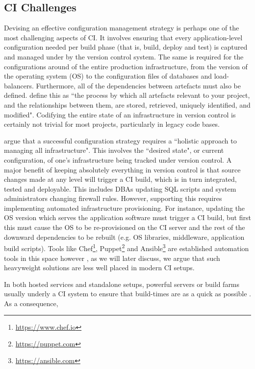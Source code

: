\documentclass[journal]{IEEEtran}
\begin{document}
\subsection{CI Challenges}
Devising an effective configuration management strategy is perhaps one of the
most challenging aspects of CI. It involves ensuring that every application-level configuration
needed per build phase (that is, build, deploy and test) is captured and managed under by the
version control system. The same is required for the configurations around of the entire
production infrastructure, from the version of the operating system (OS)
to the configuration files of databases and load-balancers. Furthermore, all of 
the dependencies between artefacts must also be defined. \citep{Jez}
define this as ``the process by which all artefacts relevant to
your project, and the relationships between them, are stored, retrieved, uniquely
identified, and modified". Codifying the entire state of an infrastructure in
version control is certainly not trivial for most projects, particularly in legacy code bases.
\par
\citet{Jez} argue that a successful configuration strategy requires a ``holistic approach to 
managing all infrastructure". This involves the ``desired state", or current configuration, of 
one's infrastructure being tracked under version control. A major benefit of keeping
absolutely everything in version control is that source 
changes made at any level will trigger a CI build, which is in turn integrated, tested and deployable. 
This includes DBAs updating SQL scripts and system administrators changing firewall 
rules. However, supporting this requires implementing automated infrastructure provisioning.
For instance, updating the OS version which serves the application software
must trigger a CI build, but first this must cause 
the OS to be re-provisioned on the CI server and the rest of the downward dependencies 
to be rebuilt (e.g. OS libraries, middleware, application build scripts).  Tools like 
Chef\footnote{\href{https://www.chef.io}{https://www.chef.io}},
Puppet\footnote{\href{https://puppet.com}{https://puppet.com}}
and Ansible\footnote{\href{https://www.ansible.com}{https://ansible.com}}
 are established automation tools in this space however \citep{Rensin}, as we will later discuss, 
we argue that such heavyweight solutions are less well placed in modern CI setups.
\par
In both hosted services and standalone setups, powerful servers or build farms usually 
underly a CI system to ensure that build-times are as a quick as possible \citep{Campos}. As a consequence,
\end{document}
